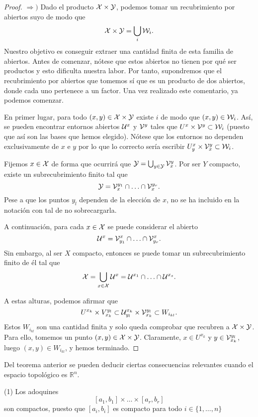 \begin{itemize}
\begin{theo}
\begin{proof}
$\Rightarrow )$ Dado el producto $\mathcal{X}\times \mathcal{Y}$, podemos tomar un recubrimiento por abiertos suyo de modo que 
\[\mathcal{X}\times \mathcal{Y}=\bigcup_{i}\mathcal{W}_i.\]
Nuestro objetivo es conseguir extraer una cantidad finita de esta familia de abiertos. Antes de comenzar, nótese que estos abiertos no tienen por qué ser productos y esto dificulta nuestra labor. Por tanto, supondremos que el recubrimiento por abiertos que tomemos sí que es un producto de dos abiertos, donde cada uno pertenece a un factor. Una vez realizado este comentario, ya podemos comenzar. 

En primer lugar, para todo $(x,y)\in\mathcal{X}\times \mathcal{Y}$ existe $i$ de modo que $(x,y)\in \mathcal{W}_i$. Así, se pueden encontrar entornos abiertos $\mathcal{U}^x$ y $\mathcal{V}^y$ tales que $U^x\times \mathcal{V}^y \subset \mathcal{W}_i$ (puesto que así son las bases que hemos elegido). Nótese que los entornos no dependen exclusivamente de $x$ e $y$ por lo que lo correcto sería escribir $U^x_y\times \mathcal{V}^y_x \subset \mathcal{W}_i$. 

Fijemos $x\in \mathcal{X}$ de forma que ocurrirá que $\mathcal{Y}=\bigcup_{y\in \mathcal{Y}} \mathcal{V}_x^y$. Por ser $Y$ compacto, existe un subrecubrimiento finito tal que 
\[\mathcal{Y}=\mathcal{V}_x^{y_1}\cap \ldots \cap \mathcal{V}_x^{y_r}.\]
Pese a que los puntos $y_l$ dependen de la elección de $x$, no se ha incluido en la notación con tal de no sobrecargarla. 

A continuación, para cada $x\in \mathcal{X}$ se puede considerar el abierto
\[\mathcal{U}^x=\mathcal{V}^x_{y_1}\cap \ldots \cap \mathcal{V}^x_{y_r}.\]
Sin embargo, al ser $X$ compacto, entonces se puede tomar un subrecubrimiento finito de él tal que
\[\mathcal{X}=\bigcup_{x\in \mathcal{X}}\mathcal{U}^x=\mathcal{U}^{x_1}\cap \ldots \cap \mathcal{U}^{x_s}.\]

A estas alturas, podemos afirmar que
\[U^{x_k}\times V_{x_k}^{y_l}\subset \mathcal{U}_{y_l}^{x_k}\times \mathcal{V}_{x_k}^{y_l}\subset W_{i_{kl}}.\]
Estos $W_{i_{kl}}$ son una cantidad finita y solo queda comprobar que recubren a $\mathcal{X}\times \mathcal{Y}$. Para ello, tomemos un punto $(x,y)\in \mathcal{X}\times \mathcal{Y}$. Claramente, $x\in U^{x_k}$ y $y\in  \mathcal{V}_{x_k}^{y_l}$, luego $(x,y)\in W_{i_{kl}}$, y hemos terminado. 
\end{proof}
\end{theo}

Del teorema anterior se pueden deducir ciertas consecuencias relevantes cuando el espacio topológico es $\mathbb{R}^n$.

\begin{obs}

(1) Los adoquines 
\[[a_1,b_1]\times \ldots \times [a_r,b_r]\]
son compactos, puesto que $[a_i,b_i]$ es compacto para todo $i\in \{1,\ldots, n\}$


\end{obs}
\end{itemize}
